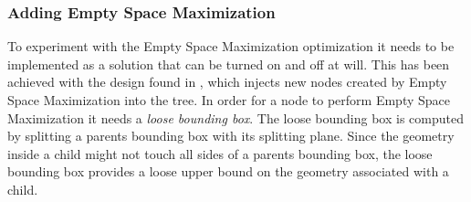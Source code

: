 \subsubsection{Adding Empty Space Maximization}\label{sec:gpuEmptySpace}


To experiment with the Empty Space Maximization optimization it needs to be
implemented as a solution that can be turned on and off at will. This has been
achieved with the design found in , which
injects new nodes created by Empty Space Maximization into the tree. In order for
a node to perform Empty Space Maximization it needs a \textit{loose bounding
  box}. The loose bounding box is computed by splitting a parents bounding box
with its splitting plane. Since the geometry inside a child might not touch all
sides of a parents bounding box, the loose bounding box provides a loose upper
bound on the geometry associated with a child.

